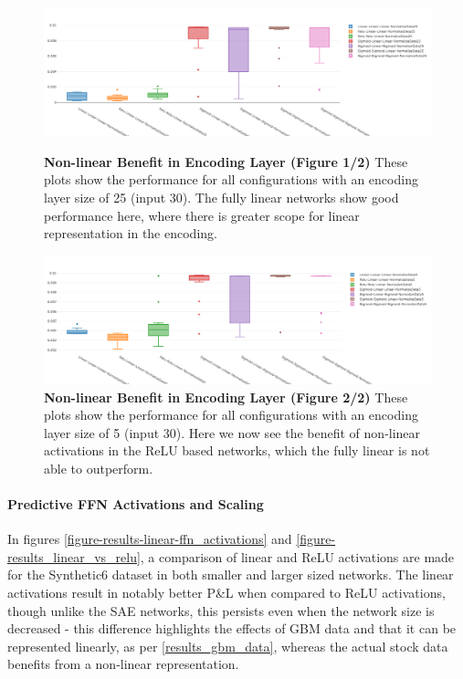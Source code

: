 \documentclass[a4paper,latin]{paper}
\begin{document}
\begin{figure}[H]
	\centering
	\begin{minipage}{0.45\textwidth}
	\centering \includegraphics[scale=0.2]{images/iteration_two/linear/3Encoding_25_Activation_Combos_Min_MSE.png}
	\caption{\textbf{Non-linear Benefit in Encoding Layer (Figure 1/2)}
		\newline These plots show the performance for all configurations with an encoding layer size of 25 (input 30). The fully linear networks show good performance here, where there is greater scope for linear representation in the encoding.}
	\label{figure-results-encoding25}
	\end{minipage}\hfill
	\begin{minipage}{0.45\textwidth}
	\centering \includegraphics[scale=0.2]{images/iteration_two/linear/4Encoding_5_Activation_Combos_Min_MSE.png}
	\caption{\textbf{Non-linear Benefit in Encoding Layer (Figure 2/2)}
		\newline These plots show the performance for all configurations with an encoding layer size of 5 (input 30). Here we now see the benefit of non-linear activations in the ReLU based networks, which the fully linear is not able to outperform.}
	\label{figure-results-encoding5}
	\end{minipage}
\end{figure}

\paragraph{Predictive FFN Activations and Scaling}

In figures \ref{figure-results-linear-ffn_activations} and \ref{figure-results_linear_vs_relu}, a comparison of linear and ReLU activations are made for the Synthetic6 dataset in both smaller and larger sized networks. The linear activations result in notably better P\&L when compared to ReLU activations, though unlike the SAE networks, this persists even when the network size is decreased - this difference highlights the effects of GBM data and that it can be represented linearly, as per \ref{results_gbm_data}, whereas the actual stock data benefits from a non-linear representation.\newline
\end{document}
